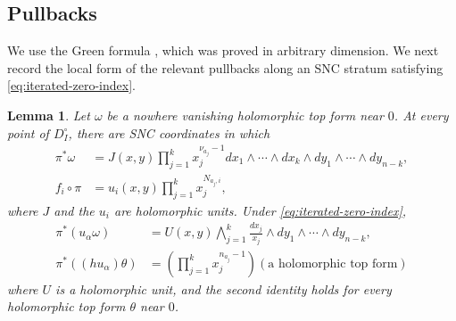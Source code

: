 \documentclass[12pt]{amsart}
\numberwithin{equation}{section}
\theoremstyle{plain}
\newtheorem{lemma}[theorem]{Lemma}
\theoremstyle{definition}
\theoremstyle{remark}
\theoremstyle{definition}
\begin{document}
\subsection{Pullbacks}

We use the Green formula , which was proved in arbitrary dimension. We next record the local form of the relevant pullbacks along an SNC stratum satisfying \eqref{eq:iterated-zero-index}.

\begin{lemma}
\label{lem:iterated-simultaneous-orders}
Let $\omega$ be a nowhere vanishing holomorphic top form near $0$. At every point of $D_I^\circ$, there are SNC coordinates in which
\begin{align}
 \pi^*\omega&=J(x,y)\prod_{j=1}^kx_j^{\nu_{a_j}-1}
 dx_1\wedge\cdots\wedge dx_k\wedge
 dy_1\wedge\cdots\wedge dy_{n-k},\label{eq:iterated-jacobian}\\
 f_i\circ\pi&=u_i(x,y)\prod_{j=1}^kx_j^{N_{a_j,i}},
 \label{eq:iterated-functions}
\end{align}
where $J$ and the $u_i$ are holomorphic units. Under
\eqref{eq:iterated-zero-index},
\begin{align}
 \pi^*(u_\alpha\omega)&=
 U(x,y)\bigwedge_{j=1}^k\frac{dx_j}{x_j}
 \wedge dy_1\wedge\cdots\wedge dy_{n-k},
 \label{eq:iterated-leading-form}\\
 \pi^*((hu_\alpha)\theta)&=
 \left(\prod_{j=1}^kx_j^{n_{a_j}-1}\right)
 (\text{a holomorphic top form})
 \label{eq:iterated-shifted-order}
\end{align}
where $U$ is a holomorphic unit, and the second identity holds for every holomorphic top form $\theta$ near $0$.
\end{lemma}
\end{document}
